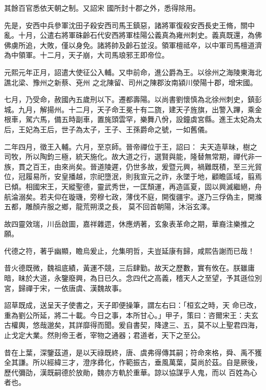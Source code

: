 \begin{pinyinscope}
 其餘百官悉依天朝之制。又詔宋
 國所封十郡之外，悉得除用。



 先是，安西中兵參軍沈田子殺安西司馬王鎮惡，諸將軍復殺安西長史王脩，關中亂。十月，公遣右將軍硃齡石代安西將軍桂陽公義真為雍州刺史。義真既還，為佛佛虜所追，大敗，僅以身免。諸將帥及齡石並沒。領軍檀祗卒，以中軍司馬檀道濟為中領軍。十二月，天子崩，大司馬琅邪王即帝位。



 元熙元年正月，詔遣大使征公入輔。又申前命，進公爵為王。以徐州之海陵東海北譙北梁、豫州之新蔡、兗州
 之北陳留、司州之陳郡汝南潁川滎陽十郡，增宋國。



 七月，乃受命，赦國內五歲刑以下。遷都壽陽。以尚書劉懷慎為北徐州刺史，鎮彭城。九月，解揚州。十二月，天子命王冕十有二旒，建天子旌旗，出警入蹕，乘金根車，駕六馬，備五時副車，置旄頭雲罕，樂舞八佾，設鐘虡宮縣。進王太妃為太后，王妃為王后，世子為太子，王子、王孫爵命之號，一如舊儀。



 二年四月，徵王入輔。六月，至京師。晉帝禪位于王，詔曰：
 夫天造草昧，樹之司牧，所以陶鈞三極，統天施化。故大道之行，選賢與能，隆替無常期，禪代非一族，貫之百王，由來尚矣。晉道陵遲，仍世多故，爰暨元興，禍難既積，至三光貿位，冠履易所，安皇播越，宗祀墮泯，則我宣元之祚，永墜于地，顧瞻區域，翦焉已傾。相國宋王，天縱聖德，靈武秀世，一匡頹運，再造區夏，固以興滅繼絕，舟航淪溺矣。若夫仰在璇璣，旁穆七政，薄伐不庭，開復疆宇。遂乃三俘偽主，開滌五都，雕顏卉服之鄉，龍荒朔漠之長，
 莫不回首朝陽，沐浴玄澤。



 故四靈效瑞，川岳啟圖，嘉祥雜遝，休應炳著，玄象表革命之期，華裔注樂推之願。



 代德之符，著乎幽顯，瞻烏爰止，允集明哲，夫豈延康有歸，咸熙告謝而已哉！



 昔火德既微，魏祖底績，黃運不競，三后肆勤。故天之歷數，實有攸在。朕雖庸暗，昧於大道，永鑒廢興，為日已久。念四代之高義，稽天人之至望，予其遜位別宮，歸禪于宋，一依唐虞、漢魏故事。



 詔草既成，送呈天子使書之，天子即便操筆，謂左右曰：「桓玄之時，天
 命已改，重為劉公所延，將二十載。今日之事，本所甘心。」甲子，策曰：咨爾宋王：夫玄古權輿，悠哉邈矣，其詳靡得而聞。爰自書契，降逮三、五，莫不以上聖君四海，止戈定大業。然則帝王者，宰物之通器；君道者，天下之至公。



 昔在上葉，深鑒茲道，是以天祿既終，唐、虞弗得傳其嗣；符命來格，舜、禹不獲全其謙。所以經緯三才，澄序彞化，作範振古，垂風萬葉，莫尚於茲。自是厥後，歷代彌劭，漢既嗣德於放勛，魏亦方軌於重華。諒以協謀乎人鬼，而以
 百姓為心者也。




\end{pinyinscope}
